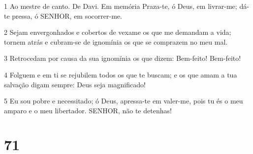 \par 1 Ao mestre de canto. De Davi. Em memória Praza-te, ó Deus, em livrar-me; dá-te pressa, ó SENHOR, em socorrer-me.
\par 2 Sejam envergonhados e cobertos de vexame os que me demandam a vida; tornem atrás e cubram-se de ignomínia os que se comprazem no meu mal.
\par 3 Retrocedam por causa da sua ignomínia os que dizem: Bem-feito! Bem-feito!
\par 4 Folguem e em ti se rejubilem todos os que te buscam; e os que amam a tua salvação digam sempre: Deus seja magnificado!
\par 5 Eu sou pobre e necessitado; ó Deus, apressa-te em valer-me, pois tu és o meu amparo e o meu libertador. SENHOR, não te detenhas!

\chapter{71}

